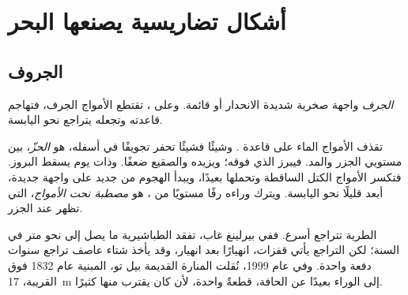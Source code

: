 \section{أشكال تضاريسية يصنعها البحر}

\subsection{الجروف}

\begin{definition}[الجرف]\label{def:g9:landforms:cliff}
\emph{الجرف} واجهة صخرية شديدة الانحدار أو قائمة. وعلى
، تقتطع الأمواج الجرف، فتهاجم قاعدته وتجعله يتراجع نحو
اليابسة.
\end{definition}

تقذف الأمواج الماء   على قاعدة . وشيئًا فشيئًا تحفر
تجويفًا في أسفله، هو \emph{الحزّ}، بين مستويي الجزر والمد. فيبرز 
الذي فوقه؛ ويزيده  والصقيع ضعفًا. وذات يوم يسقط البروز. فتكسر
الأمواج الكتل الساقطة وتحملها بعيدًا، ويبدأ الهجوم من جديد على واجهة
جديدة، أبعد قليلًا نحو اليابسة. ويترك  وراءه رفًا مستويًا من
، هو \emph{مصطبة نحت الأمواج}، التي تظهر
عند الجزر.

 الطرية تتراجع أسرع. ففي بيرلينغ غاب، تفقد  الطباشيرية ما
يصل إلى نحو متر في السنة؛ لكن التراجع يأتي قفزات، انهيارًا بعد انهيار،
وقد يأخذ شتاء عاصف تراجع سنوات دفعة واحدة. وفي عام 1999، نُقلت المنارة
القديمة بيل تو، المبنية عام 1832 فوق  القريبة، \qty{17}{m} إلى
الوراء بعيدًا عن الحافة، قطعةً واحدة، لأن  كان يقترب منها
كثيرًا.

